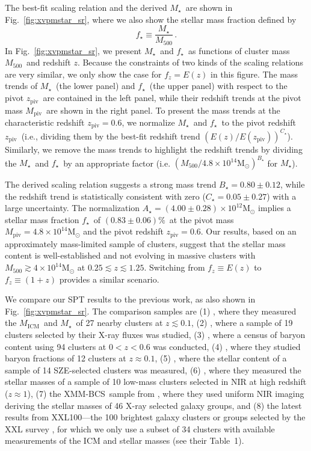 \documentclass[useAMS,usenatbib,iop,numberedappendix]{mn2e}
\newcommand{\Msun}{\ensuremath{\mathrm{M}_{\odot}}}
\newcommand{\Mfiveoo}{\ensuremath{M_{500}}}
\newcommand{\redshift}{\ensuremath{z}}
\newcommand{\XMMBCS}{XMM-BCS}
\newcommand{\Mstar}{\ensuremath{M_{\star}}}
\newcommand{\Mgas}{\ensuremath{M_{\mathrm{ICM}}}}
\newcommand{\MPIV}{\ensuremath{M_{\mathrm{piv}}}}
\newcommand{\ZPIV}{\ensuremath{z_{\mathrm{piv}}}}
\newcommand{\Astar}{\ensuremath{A_{\star}}}
\newcommand{\Bstar}{\ensuremath{B_{\star}}}
\newcommand{\Cstar}{\ensuremath{C_{\star}}}
\newcommand{\fstar}{\ensuremath{f_{\star}}}
\newcommand{\percent}{\ensuremath{\%}}
\newcommand{\numAstaronezsys}{\ensuremath{4.00\pm0.28}}
\newcommand{\numBstaronezsys}{\ensuremath{0.80\pm0.12}}
\newcommand{\numCstaronezsys}{\ensuremath{0.05\pm0.27}}
\begin{document}
The best-fit scaling relation and the derived \Mstar\ are shown in Fig.~\ref{fig:xvpmstar_sr}, where we also show the stellar mass fraction defined by
\[
\fstar \equiv \frac{\Mstar}{\Mfiveoo} \, .
\]
In Fig.~\ref{fig:xvpmstar_sr}, we present \Mstar\ and \fstar\ as functions of cluster mass \Mfiveoo\ and redshift \redshift.  Because the constraints of two kinds of the scaling relations are very similar, we only show the case for $f_{\redshift} = E(z)$ in this figure.
The mass trends of \Mstar\ (the lower panel) and \fstar\ (the upper panel) with respect to the pivot \ZPIV\ are contained in the left panel, while their redshift trends at the pivot mass \MPIV\ are shown in the right panel.
To present the mass trends at the characteristic redshift $\ZPIV=0.6$, we normalize \Mstar\ and \fstar\ to the pivot redshift \ZPIV\ (i.e., dividing them by the best-fit redshift trend $\left(E(\redshift) / E(\ZPIV)\right)^{\Cstar}$).
Similarly, we remove the mass trends to highlight the redshift trends by dividing the \Mstar\ and \fstar\ by an appropriate factor (i.e. $\left( \Mfiveoo/4.8\times10^{14}\Msun\right)^{\Bstar}$ for \Mstar).


The derived scaling relation suggests a strong mass trend $\Bstar = \numBstaronezsys$, while the redshift trend is statistically consistent with zero ($\Cstar = \numCstaronezsys$) with a large uncertainty.
The normalization $\Astar =(\numAstaronezsys)\times10^{12}\Msun$ implies a stellar mass fraction \fstar\ of $(0.83\pm0.06)$\percent\ at the pivot mass $\MPIV = 4.8\times10^{14}\Msun$ and the pivot redshift $\ZPIV = 0.6$.
Our results, based on an approximately mass-limited sample of clusters, suggest that the stellar mass content is well-established and not evolving in massive clusters with $\Mfiveoo\gtrsim4\times10^{14}\Msun$ at $0.25\lesssim\redshift\lesssim1.25$.
Switching from $f_{\redshift} \equiv E(\redshift)$ to $f_{\redshift} \equiv (1 + \redshift)$ provides a similar scenario.


We compare our SPT results to the previous work, as also shown in Fig.~\ref{fig:xvpmstar_sr}.
The comparison samples are 
(1) \citet[][L03]{lin03b}, where they measured the \Mgas\ and \Mstar\ of 27 nearby clusters at $\redshift\lesssim0.1$,
(2) \citet[][Z11]{zhang11}, where a sample of 19 clusters selected by their X-ray fluxes was studied, 
(3) \citet[][L12]{lin12}, where a census of baryon content using 94 clusters at $0 < \redshift < 0.6$ was conducted,
(4) \citet[][GZZ13]{gonzalez13}, where they studied baryon fractions of 12 clusters at $\redshift \approx 0.1$, 
(5) \citet[][H13]{hilton13}, where the stellar content of a sample of 14 SZE-selected clusters was measured,
(6) \citet[][vdB14]{burg14}, where they measured the stellar masses of a sample of 10 low-mass clusters selected in NIR at high redshift ($\redshift\approx1$),
(7) the \XMMBCS\ sample from \citet{chiu16c}, where they used uniform NIR imaging deriving the stellar masses of 46 X-ray selected galaxy groups, and
(8) the latest results from XXL100---the 100 brightest galaxy clusters or groups selected by the XXL survey \citep{eckert16}, for which we only use a subset of 34 clusters with available measurements of the ICM and stellar masses (see their Table~1).
\end{document}
